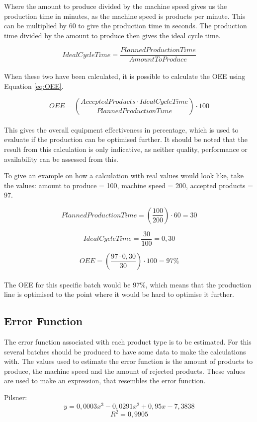 Where the amount to produce divided by the machine speed gives us the production
time in minutes, as the machine speed is products per minute. This can be
multiplied by 60 to give the production time in seconds. The production time
divided by the amount to produce then gives the ideal cycle time.

\[IdealCycleTime = \frac{PlannedProductionTime}{AmountToProduce}\]\\

When these two have been calculated, it is possible to calculate the OEE using
Equation \ref{eq:OEE}.

\[OEE = \left(\frac{AcceptedProducts\cdot{IdealCycleTime}}{PlannedProductionTime}\right)\cdot100\]\\

This gives the overall equipment effectiveness in percentage, which is used to
evaluate if the production can be optimised further. It should be noted that
the result from this calculation is only indicative, as neither quality,
performance or availability can be assessed from this.

To give an example on how a calculation with real values would look like, take
the values: amount to produce = 100, machine speed = 200, accepted products = 97.

\[PlannedProductionTime = \left(\frac{100}{200}\right)\cdot60 = 30\]

\[IdealCycleTime = \frac{30}{100}=0,30\]

\[OEE = \left(\frac{97\cdot0,30}{30}\right)\cdot100 = 97\%\]\\

The OEE for this specific batch would be 97\%, which means that the production
line is optimised to the point where it would be hard to optimise it further.

\subsection{Error Function}
The error function associated with each product type is to be estimated. For
this several batches should be produced to have some data to make the
calculations with. The values used to estimate the error function is the amount
of products to produce, the machine speed and the amount of rejected products.
These values are used to make an expression, that resembles the error function. 


Pilsner:\\
\[y = 0,0003x^3 - 0,0291x^2 + 0,95x - 7,3838\]
\[R^2 = 0,9905\]

